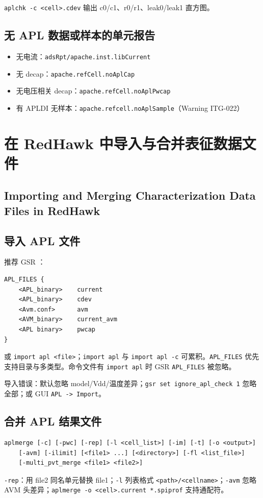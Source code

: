 \texttt{aplchk -c <cell>.cdev} 输出 c0/c1、r0/r1、leak0/leak1 直方图。

\subsection{无 APL 数据或样本的单元报告}
\begin{itemize}
  \item 无电流：\texttt{adsRpt/apache.inst.libCurrent}
  \item 无 decap：\texttt{apache.refCell.noAplCap}
  \item 无电压相关 decap：\texttt{apache.refCell.noAplPwcap}
  \item 有 APLDI 无样本：\texttt{apache.refcell.noAplSample}（Warning ITG-022）
\end{itemize}

\section{在 RedHawk 中导入与合并表征数据文件}
\subsection*{Importing and Merging Characterization Data Files in RedHawk}

\subsection{导入 APL 文件}
推荐 GSR ：
\begin{lstlisting}
APL_FILES {
    <APL_binary>    current
    <APL_binary>    cdev
    <Avm.conf>      avm
    <AVM_binary>    current_avm
    <APL binary>    pwcap
}
\end{lstlisting}
或 \texttt{import apl <file>}；\texttt{import apl} 与 \texttt{import apl -c} 可累积。\texttt{APL\_FILES} 优先支持目录与多类型。命令文件有 \texttt{import apl} 时 GSR \texttt{APL\_FILES} 被忽略。

导入错误：默认忽略 model/Vdd/温度差异；\texttt{gsr set ignore\_apl\_check 1} 忽略全部；或 GUI \texttt{APL -> Import}。

\subsection{合并 APL 结果文件}
\begin{lstlisting}
aplmerge [-c] [-pwc] [-rep] [-l <cell_list>] [-im] [-t] [-o <output>]
    [-avm] [-ilimit] [<file1> ...] [<directory>] [-fl <list_file>]
    [-multi_pvt_merge <file1> <file2>]
\end{lstlisting}
\texttt{-rep}：用 file2 同名单元替换 file1；\texttt{-l} 列表格式 \texttt{<path>/<cellname>}；\texttt{-avm} 忽略 AVM 头差异；\texttt{aplmerge -o <cell>.current *.spiprof} 支持通配符。

